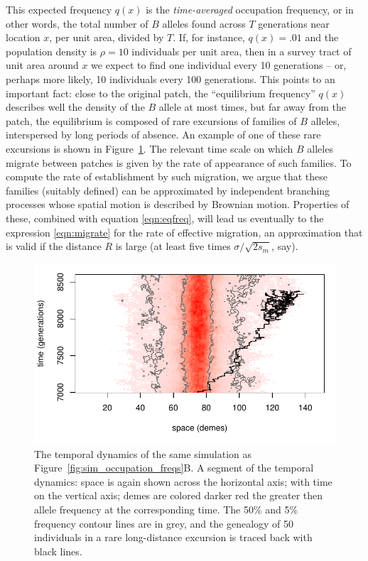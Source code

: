 \documentclass{article}
\begin{document}
This expected frequency $q(x)$ is the \emph{time-averaged} occupation frequency,
or in other words, the total number of $B$ alleles found across $T$ generations near location $x$, per unit area, divided by $T$.
If, for instance, $q(x)=.01$ and the population density is $\rho=10$ individuals per unit area, 
then in a survey tract of unit area around $x$ we expect to find one individual every 10 generations
-- or, perhaps more likely, 10 individuals every 100 generations.
This points to an important fact: 
close to the original patch, the ``equilibrium frequency'' $q(x)$ describes well the density of the $B$ allele at most times,
but far away from the patch, 
the equilibrium is composed of rare excursions of families of $B$
alleles, interspersed by long periods of absence. 
An example of one of these rare excursions is shown in Figure~\ref{fig:sim_snapshots}.
The relevant time scale on which $B$ alleles migrate between patches is given by the rate of appearance of such families.
To compute the rate of establishment by such migration,
we argue that these families (suitably defined) can be approximated by
independent branching processes whose spatial motion is described by Brownian motion.
Properties of these, combined with equation \eqref{eqn:eqfreq},
will lead us eventually to the expression \eqref{eqn:migrate} for the rate of effective migration,
an approximation that is valid if the distance $R$ is large (at least five times $\sigma/\sqrt{2s_m}$, say).

\begin{figure}[ht!]
  \begin{center}
    \includegraphics{sim-snapshots}
  \end{center}
  \caption{
  The temporal dynamics of the same simulation as Figure~\ref{fig:sim_occupation_freqs}B.
  A segment of the temporal dynamics: space is again shown across the horizontal axis;
  with time on the vertical axis; demes are colored darker red the greater then allele frequency at the corresponding time.
  The 50\% and 5\% frequency contour lines are in grey,
  and the genealogy of 50 individuals in a rare long-distance excursion is traced back with black lines.
  }   \label{fig:sim_snapshots}
\end{figure}
\end{document}
